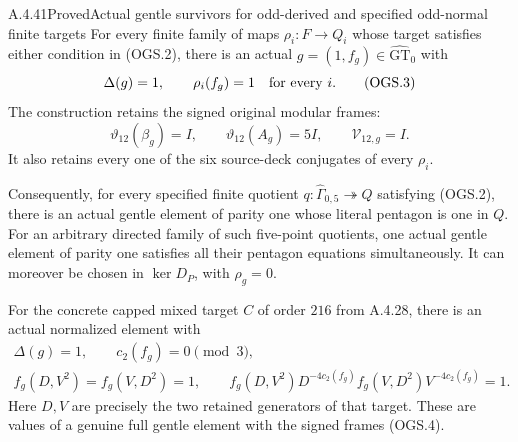 \begin{result}{A.4.41}{Proved}{Actual gentle survivors for odd-derived and specified odd-normal finite targets}
For every finite family of maps $\rho_i:F\to Q_i$
whose target satisfies either condition in (OGS.2),
there is an actual $g=(1,f_g)\in\widehat{\mathrm{GT}}_0$
with
\[
 \Delta(g)=1,\qquad
 \rho_i(f_g)=1\quad\hbox{for every }i.
                                                               \tag{OGS.3}
\]
The construction retains the signed original modular
frames:
\[
 \vartheta_{12}(\beta_g)=I,\qquad
 \vartheta_{12}(A_g)=5I,\qquad
 \mathcal V_{12,g}=I.
                                                               \tag{OGS.4}
\]
It also retains every one of the six source-deck
conjugates of every $\rho_i$.

Consequently, for every specified finite quotient
$q:\widehat\Gamma_{0,5}\twoheadrightarrow Q$ satisfying
(OGS.2), there is an actual gentle element of parity one
whose literal pentagon is one in $Q$.
For an arbitrary directed family of such five-point
quotients, one actual gentle element of parity one
satisfies all their pentagon equations simultaneously.
It can moreover be chosen in $\ker D_P$, with $\rho_g=0$.

For the concrete capped mixed target $C$ of order $216$
from A.4.28, there is an actual normalized element with
\[
\begin{gathered}
 \Delta(g)=1,\qquad c_2(f_g)=0\pmod3,\\
 f_g(D,V^2)=f_g(V,D^2)=1,\qquad
 f_g(D,V^2)D^{-4c_2(f_g)}
       f_g(V,D^2)V^{-4c_2(f_g)}=1 .
\end{gathered}                                                   \tag{OGS.5}
\]
Here $D,V$ are precisely the two retained generators
of that target.  These are values of a genuine full
gentle element with the signed frames (OGS.4).
\end{result}
